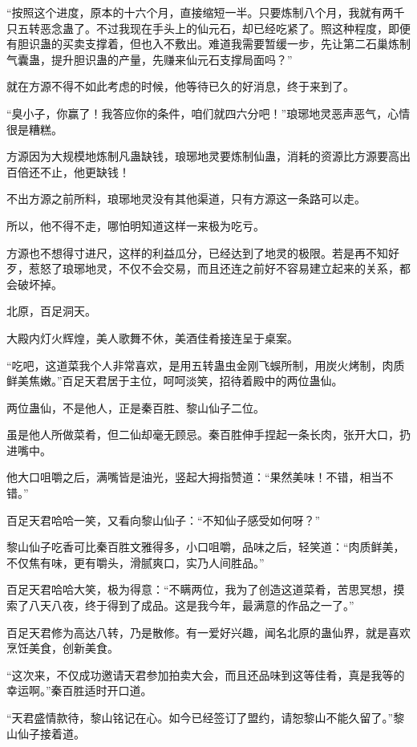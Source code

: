 \begin{this_body}
“按照这个进度，原本的十六个月，直接缩短一半。只要炼制八个月，我就有两千只五转恶念蛊了。不过我现在手头上的仙元石，却已经吃紧了。照这种程度，即便有胆识蛊的买卖支撑着，但也入不敷出。难道我需要暂缓一步，先让第二石巢炼制气囊蛊，提升胆识蛊的产量，先赚来仙元石支撑局面吗？”

就在方源不得不如此考虑的时候，他等待已久的好消息，终于来到了。

“臭小子，你赢了！我答应你的条件，咱们就四六分吧！”琅琊地灵恶声恶气，心情很是糟糕。

方源因为大规模地炼制凡蛊缺钱，琅琊地灵要炼制仙蛊，消耗的资源比方源要高出百倍还不止，他更缺钱！

不出方源之前所料，琅琊地灵没有其他渠道，只有方源这一条路可以走。

所以，他不得不走，哪怕明知道这样一来极为吃亏。

方源也不想得寸进尺，这样的利益瓜分，已经达到了地灵的极限。若是再不知好歹，惹怒了琅琊地灵，不仅不会交易，而且还连之前好不容易建立起来的关系，都会破坏掉。

北原，百足洞天。

大殿内灯火辉煌，美人歌舞不休，美酒佳肴接连呈于桌案。

“吃吧，这道菜我个人非常喜欢，是用五转蛊虫金刚飞蜈所制，用炭火烤制，肉质鲜美焦嫩。”百足天君居于主位，呵呵淡笑，招待着殿中的两位蛊仙。

两位蛊仙，不是他人，正是秦百胜、黎山仙子二位。

虽是他人所做菜肴，但二仙却毫无顾忌。秦百胜伸手捏起一条长肉，张开大口，扔进嘴中。

他大口咀嚼之后，满嘴皆是油光，竖起大拇指赞道：“果然美味！不错，相当不错。”

百足天君哈哈一笑，又看向黎山仙子：“不知仙子感受如何呀？”

黎山仙子吃香可比秦百胜文雅得多，小口咀嚼，品味之后，轻笑道：“肉质鲜美，不仅焦有味，更有嚼头，滑腻爽口，实乃人间胜品。”

百足天君哈哈大笑，极为得意：“不瞒两位，我为了创造这道菜肴，苦思冥想，摸索了八天八夜，终于得到了成品。这是我今年，最满意的作品之一了。”

百足天君修为高达八转，乃是散修。有一爱好兴趣，闻名北原的蛊仙界，就是喜欢烹饪美食，创新美食。

“这次来，不仅成功邀请天君参加拍卖大会，而且还品味到这等佳肴，真是我等的幸运啊。”秦百胜适时开口道。

“天君盛情款待，黎山铭记在心。如今已经签订了盟约，请恕黎山不能久留了。”黎山仙子接着道。


\end{this_body}
